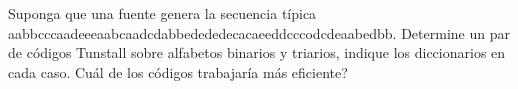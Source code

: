 
Suponga que una fuente genera la secuencia típica aabbcccaadeeeaabcaadcdabbedededecacaeeddcccodcdeaabedbb. Determine un par de códigos Tunstall sobre alfabetos binarios y triarios, indique los diccionarios en cada caso. Cuál de los códigos trabajaría más eficiente?
